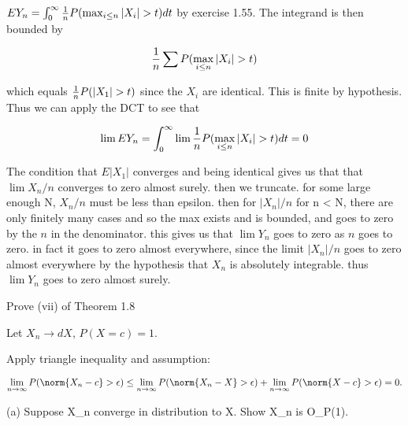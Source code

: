 \documentclass[]{book}
\theoremstyle{definition}
\theoremstyle{definition}
\theoremstyle{definition}
\theoremstyle{remark}
\let\BeginKnitrBlock\begin \let\EndKnitrBlock\end
\begin{document}
\BeginKnitrBlock{solution}[Ex 115 (a)]
\iffalse{} {Solution (Ex 115 (a)). }
\fi{}\(E Y_n = \int_0^\infty {1 \over n} P(\max_{i \le n} |X_i| > t) dt\)
by exercise 1.55. The integrand is then bounded by

\[{1 \over n} \sum P(\max_{i \le n} |X_i| > t)\]

which equals \({1 \over n} P(|X_1| > t)\) since the \(X_i\) are
identical. This is finite by hypothesis. Thus we can apply the DCT to
see that

\[\lim E Y_n = \int_0^\infty \lim {1 \over n}  P(\max_{i \le n} |X_i| > t) dt = 0\]
\EndKnitrBlock{solution}

\BeginKnitrBlock{solution}[Ex 115 (b)]
\iffalse{} {Solution (Ex 115 (b)). } \fi{}The condition that \(E |X_1|\)
converges and being identical gives us that that \(\lim X_n / n\)
converges to zero almost surely. then we truncate. for some large enough
N, \(X_n / n\) must be less than epsilon. then for \(|X_n| / n\) for n
\textless{} N, there are only finitely many cases and so the max exists
and is bounded, and goes to zero by the \(n\) in the denominator. this
gives us that \(\lim Y_n\) goes to zero as \(n\) goes to zero. in fact
it goes to zero almost everywhere, since the limit \(|X_n| / n\) goes to
zero almost everywhere by the hypothesis that \(X_n\) is absolutely
integrable. thus \(\lim Y_n\) goes to zero almost surely.
\EndKnitrBlock{solution}

\BeginKnitrBlock{exercise}[Ex 117]
\protect\hypertarget{exr:unnamed-chunk-70}{}{\label{exr:unnamed-chunk-70}
\iffalse (Ex 117) \fi{} }
\EndKnitrBlock{exercise}

\BeginKnitrBlock{exercise}[Ex 126]
\protect\hypertarget{exr:unnamed-chunk-71}{}{\label{exr:unnamed-chunk-71}
\iffalse (Ex 126) \fi{} }Prove (vii) of Theorem 1.8
\EndKnitrBlock{exercise}

\BeginKnitrBlock{solution}
\iffalse{} {Solution. } \fi{}Let \(X_n \to d X\), \(P(X = c) = 1\).

Apply triangle inequality and assumption:

\[
  \lim_{n \to \infty} P(\norm{X_n - c} > \epsilon) \le \lim_{n \to \infty} P(\norm{X_n - X} > \epsilon) + \lim_{n \to \infty} P(\norm{X - c} > \epsilon) = 0.
\]
\EndKnitrBlock{solution}

\BeginKnitrBlock{exercise}[Ex 127]
\protect\hypertarget{exr:unnamed-chunk-73}{}{\label{exr:unnamed-chunk-73}
\iffalse (Ex 127) \fi{} }(a) Suppose X\_n converge in distribution to X.
Show X\_n is O\_P(1).
\EndKnitrBlock{exercise}
\end{document}
